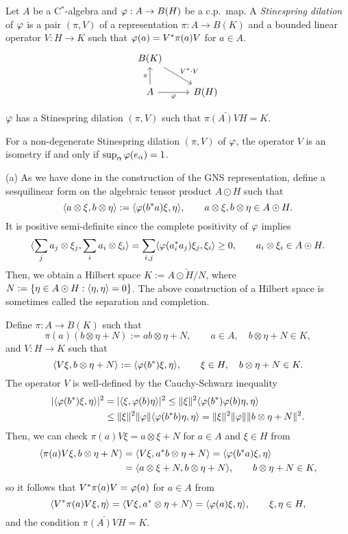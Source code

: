 \documentclass{../../large}
\begin{document}
\begin{prb}
Let $A$ be a C$^*$-algebra and $\varphi:A\to B(H)$ be a c.p.~map.
A \emph{Stinespring dilation} of $\varphi$ is a pair $(\pi,V)$ of a representation $\pi:A\to B(K)$ and a bounded linear operator $V:H\to K$ such that $\varphi(a)=V^*\pi(a)V$ for $a\in A$.
\[\begin{tikzcd}
B(K) \ar{dr}{V^*\cdot V} &\\
A \ar[swap]{r}{\f} \ar{u}{\pi} & B(H)
\end{tikzcd}\]
\begin{parts}
\item $\varphi$ has a Stinespring dilation $(\pi,V)$ such that $\bar{\pi(A)VH}=K$.
\item For a non-degenerate Stinespring dilation $(\pi,V)$ of $\varphi$, the operator $V$ is an isometry if and only if $\sup_\alpha\varphi(e_\alpha)=1$.
\end{parts}
\end{prb}
\begin{pf}
(a)
As we have done in the construction of the GNS representation, define a sesquilinear form on the algebraic tensor product $A\odot H$ such that
\[\langle a\otimes\xi,b\otimes\eta\rangle:=\langle\varphi(b^*a)\xi,\eta\rangle,\qquad a\otimes\xi,b\otimes\eta\in A\odot H.\]
It is positive semi-definite since the complete positivity of $\varphi$ implies
\[\langle\sum_ja_j\otimes\xi_j,\sum_ia_i\otimes\xi_i\rangle=\sum_{i,j}\langle\varphi(a_i^*a_j)\xi_j,\xi_i\rangle\ge0,\qquad a_i\otimes\xi_i\in A\odot H.\]
Then, we obtain a Hilbert space $K:=\bar{A\odot H/N}$, where $N:=\{\eta\in A\odot H:\langle\eta,\eta\rangle=0\}$.
The above construction of a Hilbert space is sometimes called the separation and completion.

Define $\pi:A\to B(K)$ such that
\[\pi(a)(b\otimes\eta+N):=ab\otimes\eta+N,\qquad a\in A,\quad b\otimes\eta+N\in K,\]
and $V:H\to K$ such that
\[\langle V\xi,b\otimes\eta+N\rangle:=\langle\varphi(b^*)\xi,\eta\rangle,\qquad\xi\in H,\quad b\otimes\eta+N\in K.\]
The operator $V$ is well-defined by the Cauchy-Schwarz inequality
\begin{align*}
|\langle\varphi(b^*)\xi,\eta\rangle|^2&=|\langle\xi,\varphi(b)\eta\rangle|^2\le\|\xi\|^2\langle\varphi(b^*)\varphi(b)\eta,\eta\rangle\\
&\le\|\xi\|^2\|\varphi\|\langle\varphi(b^*b)\eta,\eta\rangle=\|\xi\|^2\|\varphi\|\|b\otimes\eta+N\|^2.
\end{align*}
Then, we can check $\pi(a)V\xi=a\otimes\xi+N$ for $a\in A$ and $\xi\in H$ from
\begin{align*}
\langle\pi(a)V\xi,b\otimes\eta+N\rangle&=\langle V\xi,a^*b\otimes\eta+N\rangle=\langle\varphi(b^*a)\xi,\eta\rangle\\
&=\langle a\otimes\xi+N,b\otimes\eta+N\rangle,\qquad b\otimes\eta+N\in K,
\end{align*}
so it follows that $V^*\pi(a)V=\varphi(a)$ for $a\in A$ from
\[\langle V^*\pi(a)V\xi,\eta\rangle=\langle V\xi,a^*\otimes\eta+N\rangle=\langle\varphi(a)\xi,\eta\rangle,\qquad\xi,\eta\in H,\]
and the condition $\bar{\pi(A)VH}=K$.


\end{pf}
\end{document}
